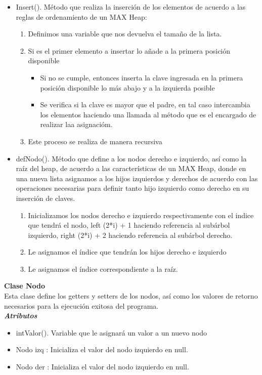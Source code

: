 \documentclass{article}
\begin{document}
\begin{itemize}
\item Insert(). Método que realiza la inserción de los elementos de acuerdo a las reglas de ordenamiento de un MAX Heap:
\begin{enumerate}
\item Definimos una variable que nos devuelva el tamaño de la lista.
\item Si es el primer elemento a insertar lo añade a la primera posición disponible
\begin{itemize}
\item Si no se cumple, entonces inserta la clave ingresada en la primera posición disponible lo más abajo y a la izquierda posible
\item Se verifica si la clave es mayor que el padre, en tal caso intercambia los elementos haciendo una llamada al método que es el encargado de realizar laa asignacióm.
\end{itemize}
\item Este proceso se realiza de manera recursiva
\end{enumerate}

\item defNodo().  Método que define a los nodos derecho e izquierdo, así como la raíz del heap, de acuerdo a las características de un MAX Heap, donde en una nueva lista asignamos a los hijos izquierdos y derechos de acuerdo con las operaciones necesarias para definir tanto hijo izquierdo como derecho en su inserción de claves.
\begin{enumerate}
\item Inicializamos los nodos derecho e izquierdo respectivamente con el indice que tendrá el nodo, left (2*i) + 1 haciendo referencia al subárbol izquierdo, right (2*i) + 2 haciendo referencia al subárbol derecho.
\item Le asignamos el índice que tendrán los hijos derecho e izquierdo
\item Le asignamos el índice correspondiente a la raíz.
\end{enumerate}
\end{itemize}

\textbf{Clase Nodo}\\

Esta clase define los getters y setters de los nodos, así como los valores de retorno necesarios para la ejecución exitosa del programa.\\

\textit{\textbf{Atributos}}
\begin{itemize}
\item intValor(). Variable que le asignará un valor a un nuevo nodo
\item Nodo izq : Inicializa el valor del nodo izquierdo en null.
\item Nodo der : Inicializa el valor del nodo izquierdo en null.
\end{itemize}
\end{document}
